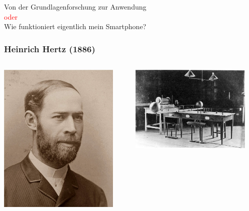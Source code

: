\documentclass[14pt]{beamer}
\begin{document}
\begin{frame}
	\centering
	\large{Von der Grundlagenforschung zur Anwendung}\\
	\small{\textcolor{red}{oder}}\\
	\large{Wie funktioniert eigentlich mein Smartphone?}
\end{frame}

\begin{frame}
	\frametitle{Heinrich Hertz (1886)}
	\begin{center}
		\begin{columns}
			\begin{column}{0.5\textwidth}
		\includegraphics[width=0.9\textwidth]{heinrich_hertz.jpg}
			\end{column}
			\begin{column}{0.5\textwidth}
		\includegraphics[width=0.9\textwidth]{heinrich_hertz_setup.jpg}

\end{column}
\end{columns}
\end{center}
\end{frame}
\end{document}
